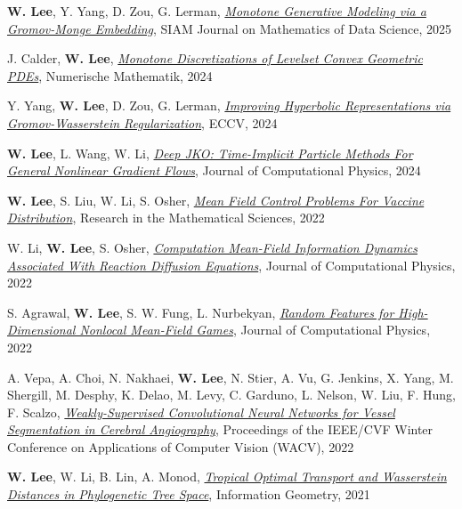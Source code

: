 \begin{cvparagraph}
\begin{cvitems}
    \medskip
  \item \textbf{W. Lee}, Y. Yang, D. Zou, G. Lerman, \href{https://arxiv.org/abs/2311.01375}{\textit{Monotone Generative Modeling via a Gromov-Monge Embedding}}, SIAM Journal on Mathematics of Data Science, 2025
    \medskip
  \item J. Calder, \textbf{W. Lee}, \href{https://rdcu.be/dZfbw}{\textit{Monotone Discretizations of Levelset Convex Geometric PDEs}}, Numerische Mathematik, 2024
    \medskip
  \item Y. Yang, \textbf{W. Lee}, D. Zou, G. Lerman, \href{http://arxiv.org/abs/2407.10495}{\textit{Improving Hyperbolic Representations via Gromov-Wasserstein Regularization}}, ECCV, 2024
    \medskip
  \item \textbf{W. Lee}, L. Wang, W. Li, \href{https://arxiv.org/abs/2311.06700}{\textit{Deep JKO: Time-Implicit Particle Methods For General Nonlinear Gradient Flows}}, Journal of Computational Physics, 2024
    \medskip
  \item \textbf{W. Lee}, S. Liu, W. Li, S. Osher, \href{https://arxiv.org/pdf/2104.11887.pdf}{\textit{Mean Field Control Problems For Vaccine Distribution}}, Research in the Mathematical Sciences, 2022
    \medskip
    \item W. Li, \textbf{W. Lee}, S. Osher, \href{https://arxiv.org/pdf/2107.11501.pdf}{\textit{Computation Mean-Field Information Dynamics Associated With Reaction Diffusion Equations}}, Journal of Computational Physics, 2022
    \medskip
    \item S. Agrawal, \textbf{W. Lee}, S. W. Fung, L. Nurbekyan, \href{https://arxiv.org/abs/2202.12529}{\textit{Random Features for High-Dimensional Nonlocal Mean-Field Games}}, Journal of Computational Physics, 2022
    \medskip
    \item A. Vepa, A. Choi, N. Nakhaei, \textbf{W. Lee}, N. Stier, A. Vu, G. Jenkins, X. Yang, M. Shergill, M. Desphy, K. Delao, M. Levy, C. Garduno, L. Nelson, W. Liu, F. Hung, F. Scalzo, \href{https://openaccess.thecvf.com/content/WACV2022/html/Vepa_Weakly-Supervised_Convolutional_Neural_Networks_for_Vessel_Segmentation_in_Cerebral_Angiography_WACV_2022_paper.html}{\textit{Weakly-Supervised Convolutional Neural Networks for Vessel Segmentation in Cerebral Angiography}}, Proceedings of the IEEE/CVF Winter Conference on Applications of Computer Vision (WACV), 2022
    \medskip
    \item \textbf{W. Lee}, W. Li, B. Lin, A. Monod, \href{https://arxiv.org/pdf/1911.05401v1.pdf}{\textit{Tropical Optimal Transport and Wasserstein Distances in Phylogenetic Tree Space}}, {Information Geometry}, 2021

\end{cvitems}
\end{cvparagraph}
